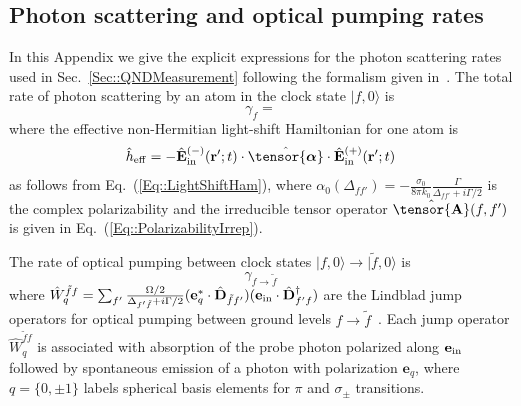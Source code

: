 \documentclass[pra,twocolumn,floatfix,superscriptaddress]{revtex4-1} %
\def\bra#1{\langle{#1}\rvert}%
\def\ket#1{\lvert{#1}\rangle}%
\newcommand{\erf}[1]{Eq.~(\ref{#1})}
\newcommand{\mbf}[1]{\mathbf{#1}}
\newcommand{\poltens}{\hat{\tensor{\boldsymbol{\alpha}}}}
\newcommand{\charpol}{\alpha_0(\Delta_{f\!f'})}
\begin{document}
\begin{appendix}

\section{Photon scattering and optical pumping rates} \label{Appendix::Rates}

In this Appendix we give the explicit expressions for the photon scattering rates used in Sec.~\ref{Sec::QNDMeasurement} following the formalism given in~\cite{deutsch_quantum_2010}.  The total rate of photon scattering by an atom in the clock state $\ket{f,0}$ is
	\begin{equation}\label{Eq::gammaf}
		\gamma_{f}=
	\end{equation}
where the effective non-Hermitian light-shift Hamiltonian for one atom is
\begin{align}
\hat{h}_{\rm eff} = - \hat{\mathbf{E}}^{(-)}_{\rm in}(\mathbf{r}' ; t ) \cdot \poltens \cdot \hat{\mathbf{E}}^{(+)}_{\rm in}(\mathbf{r}' ;t )
\end{align}
as follows from \erf{Eq::LightShiftHam}, where $\charpol = -\frac{\sigma_0}{8\pi k_0}\frac{\Gamma}{\Delta_{ff'}+i\Gamma/2}$ is the complex polarizability and the irreducible tensor operator $ \hat{\tensor{\mbf{A}}}(f,f') $ is given in \erf{Eq::PolarizabilityIrrep}.


The rate of optical pumping between clock states $\ket{f,0} \rightarrow \ket{\tilde{f},0}$ is
	\begin{equation}\label{Eq::gammaff}
		\gamma_{f \rightarrow \tilde{f} }
	\end{equation}
where $ \hat{W}_q^{\tilde{f}f} = \sum_{f'}\frac{\Omega/2}{\Delta_{f'\tilde{f}}+i\Gamma/2}(\mathbf{e}_q^*\cdot\hat{\mathbf{D}}_{\tilde{f} f'} )(\mathbf{e}_{\rm in}\cdot \hat{\mathbf{D}}^\dagger_{f'f} ) $ are the Lindblad jump operators for optical pumping between ground levels $ f\rightarrow \tilde{f} $~\cite{deutsch_quantum_2010}.
Each jump operator $\hat{W}_q^{\tilde{f}f}$ is associated with absorption of the probe photon polarized along $ \mathbf{e}_{\rm in} $ followed by spontaneous emission of a photon with polarization $ \mathbf{e}_q $, where $q= \{0,\pm 1\}$ labels spherical basis elements for $\pi$ and $ \sigma_\pm$ transitions.


\end{appendix}
\end{document}
